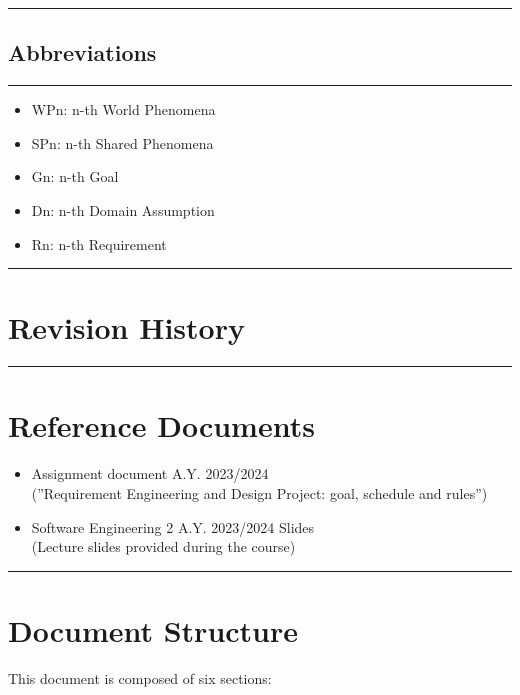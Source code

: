 \documentclass{Configuration_Files/Template}
\begin{document}
{\color{bluepoli}\rule{\linewidth}{0.1pt}}

\subsection{Abbreviations}

{\color{bluepoli}\rule{\linewidth}{0.1pt}}

\begin{itemize}
\item \textcolor{bluepoli}{WPn:} n-th World Phenomena
\item \textcolor{bluepoli}{SPn:} n-th Shared Phenomena
\item \textcolor{bluepoli}{Gn:} n-th Goal
\item \textcolor{bluepoli}{Dn:} n-th Domain Assumption
\item \textcolor{bluepoli}{Rn:} n-th Requirement
\end{itemize}

{\color{bluepoli}\rule{\linewidth}{0.1pt}}

\section{Revision History}

{\color{bluepoli}\rule{\linewidth}{0.1pt}}

\section{Reference Documents}

\begin{itemize}
\item \textcolor{bluepoli}{Assignment document A.Y. 2023/2024}\\
(”Requirement Engineering and Design Project: goal, schedule and rules”)
\item \textcolor{bluepoli}{Software Engineering 2 A.Y. 2023/2024 Slides}\\
(Lecture slides provided during the course)
\end{itemize}

{\color{bluepoli}\rule{\linewidth}{0.1pt}}

\section{Document Structure}

This document is composed of six sections:
\end{document}
